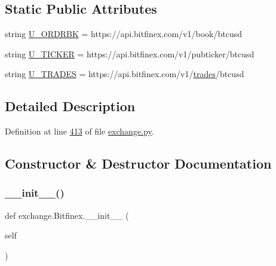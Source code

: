 \subsection*{Static Public Attributes}
\begin{DoxyCompactItemize}
\item 
string \hyperlink{classexchange_1_1_bitfinex_a81c1548dbbb9caacf43e8a6a6e8be3a4}{U\+\_\+\+O\+R\+D\+R\+BK} = \textquotesingle{}https\+://api.\+bitfinex.\+com/v1/book/btcusd\textquotesingle{}
\item 
string \hyperlink{classexchange_1_1_bitfinex_a2980dc6a7a3d6a4391ba0b2fbadfacee}{U\+\_\+\+T\+I\+C\+K\+ER} = \textquotesingle{}https\+://api.\+bitfinex.\+com/v1/pubticker/btcusd\textquotesingle{}
\item 
string \hyperlink{classexchange_1_1_bitfinex_a0c5420b5b95248ee7b57bf694b21f3b5}{U\+\_\+\+T\+R\+A\+D\+ES} = \textquotesingle{}https\+://api.\+bitfinex.\+com/v1/\hyperlink{classexchange_1_1_exchange_a30e87a377320ce05bd956fb014683641}{trades}/btcusd\textquotesingle{}
\end{DoxyCompactItemize}


\subsection{Detailed Description}


Definition at line \hyperlink{exchange_8py_source_l00413}{413} of file \hyperlink{exchange_8py_source}{exchange.\+py}.



\subsection{Constructor \& Destructor Documentation}
\mbox{\label{classexchange_1_1_bitfinex_a8c78d78f5cd885555b7a90060715d357}} 
\subsubsection{\texorpdfstring{\+\_\+\+\_\+init\+\_\+\+\_\+()}{\_\_init\_\_()}}
{\footnotesize\ttfamily def exchange.\+Bitfinex.\+\_\+\+\_\+init\+\_\+\+\_\+ (\begin{DoxyParamCaption}\item[{}]{self }\end{DoxyParamCaption})}



